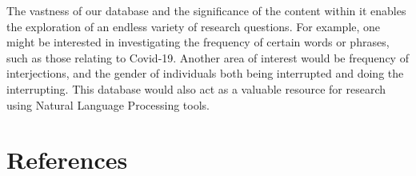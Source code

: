 \documentclass[
  letterpaper,
  DIV=11,
  numbers=noendperiod]{scrartcl}
\begin{document}
The vastness of our database and the significance of the content within
it enables the exploration of an endless variety of research questions.
For example, one might be interested in investigating the frequency of
certain words or phrases, such as those relating to Covid-19. Another
area of interest would be frequency of interjections, and the gender of
individuals both being interrupted and doing the interrupting. This
database would also act as a valuable resource for research using
Natural Language Processing tools.

\hypertarget{references}{%
\section*{References}\label{references}}
\end{document}
